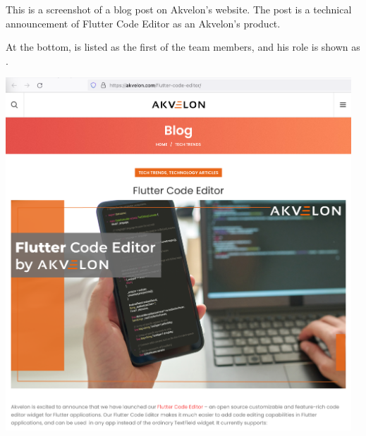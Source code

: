 
This is a screenshot of a blog post on Akvelon's website.
The post is a technical announcement of Flutter Code Editor as an Akvelon's product.

At the bottom, \mrl is listed as the first of the team members,
and his role is shown as .

\begin{center}
    \includegraphics[width=35em]{flutter-code-editor-announcement-p1}
\end{center}
\WillContinue
\pagebreak

